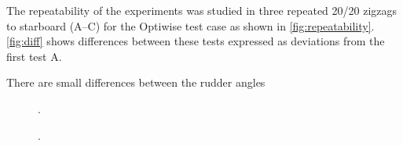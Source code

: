 \noindent The repeatability of the experiments was studied in three repeated 20/20 zigzags to starboard (A--C) for the Optiwise test case as shown in \autoref{fig:repeatability}. 
\autoref{fig:diff} shows differences between these tests expressed as deviations from the first test A. 

There are small differences between the rudder angles   

\begin{figure}[h!]
    \centering   
    
    \caption{.}
    \label{fig:repeatability}
\end{figure}
\begin{figure}[h!]
    \centering   
    
    \caption{.}
    \label{fig:diff}
\end{figure}
%    
%
%    
